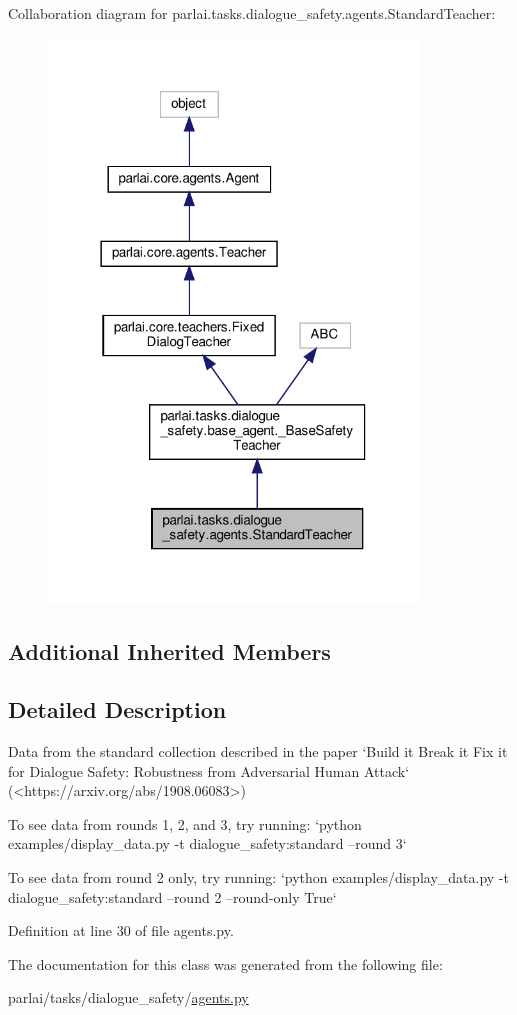 Collaboration diagram for parlai.\+tasks.\+dialogue\+\_\+safety.\+agents.\+Standard\+Teacher\+:\nopagebreak
\begin{figure}[H]
\begin{center}
\leavevmode
\includegraphics[width=278pt]{df/da8/classparlai_1_1tasks_1_1dialogue__safety_1_1agents_1_1StandardTeacher__coll__graph}
\end{center}
\end{figure}
\subsection*{Additional Inherited Members}


\subsection{Detailed Description}
\begin{DoxyVerb}Data from the standard collection described in the paper `Build it Break it Fix it
for Dialogue Safety: Robustness from Adversarial Human Attack`
(<https://arxiv.org/abs/1908.06083>)

To see data from rounds 1, 2, and 3, try running:
`python examples/display_data.py -t dialogue_safety:standard --round 3`

To see data from round 2 only, try running:
`python examples/display_data.py -t dialogue_safety:standard --round 2
 --round-only True`
\end{DoxyVerb}
 

Definition at line 30 of file agents.\+py.



The documentation for this class was generated from the following file\+:\begin{DoxyCompactItemize}
\item 
parlai/tasks/dialogue\+\_\+safety/\hyperlink{parlai_2tasks_2dialogue__safety_2agents_8py}{agents.\+py}\end{DoxyCompactItemize}
